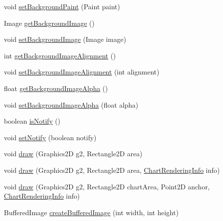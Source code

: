 \begin{DoxyCompactItemize}
\item 
void \mbox{\hyperlink{classorg_1_1jfree_1_1chart_1_1_j_free_chart_a425911935a24fdd3fde08dca49512c2a}{set\+Background\+Paint}} (Paint paint)
\item 
Image \mbox{\hyperlink{classorg_1_1jfree_1_1chart_1_1_j_free_chart_a54597d54f86fd436c244870472e317be}{get\+Background\+Image}} ()
\item 
void \mbox{\hyperlink{classorg_1_1jfree_1_1chart_1_1_j_free_chart_ab1a7deef8058f7f09b0e80c380bc2f68}{set\+Background\+Image}} (Image image)
\item 
int \mbox{\hyperlink{classorg_1_1jfree_1_1chart_1_1_j_free_chart_a2a1cf4fd0bd2aa6c7fb2ec37fabfb6f1}{get\+Background\+Image\+Alignment}} ()
\item 
void \mbox{\hyperlink{classorg_1_1jfree_1_1chart_1_1_j_free_chart_a7be0530e282f757e47b6aa9a8ac63b05}{set\+Background\+Image\+Alignment}} (int alignment)
\item 
float \mbox{\hyperlink{classorg_1_1jfree_1_1chart_1_1_j_free_chart_afe2ea70105325860b5ef380c25e42866}{get\+Background\+Image\+Alpha}} ()
\item 
void \mbox{\hyperlink{classorg_1_1jfree_1_1chart_1_1_j_free_chart_afe8e3a04968eed8d032c08b259aa7f46}{set\+Background\+Image\+Alpha}} (float alpha)
\item 
boolean \mbox{\hyperlink{classorg_1_1jfree_1_1chart_1_1_j_free_chart_ab3f7b1bca87ea773fab5f224aa25c989}{is\+Notify}} ()
\item 
void \mbox{\hyperlink{classorg_1_1jfree_1_1chart_1_1_j_free_chart_a7756201ec1d421db8880a1c243d2f6f9}{set\+Notify}} (boolean notify)
\item 
void \mbox{\hyperlink{classorg_1_1jfree_1_1chart_1_1_j_free_chart_a319d136fc007faada9be1db3005a55cd}{draw}} (Graphics2D g2, Rectangle2D area)
\item 
void \mbox{\hyperlink{classorg_1_1jfree_1_1chart_1_1_j_free_chart_a2974c0ee0d98666c061a5183f6331717}{draw}} (Graphics2D g2, Rectangle2D area, \mbox{\hyperlink{classorg_1_1jfree_1_1chart_1_1_chart_rendering_info}{Chart\+Rendering\+Info}} info)
\item 
void \mbox{\hyperlink{classorg_1_1jfree_1_1chart_1_1_j_free_chart_a1e38c9015bb05574a40f28efd4934298}{draw}} (Graphics2D g2, Rectangle2D chart\+Area, Point2D anchor, \mbox{\hyperlink{classorg_1_1jfree_1_1chart_1_1_chart_rendering_info}{Chart\+Rendering\+Info}} info)
\item 
Buffered\+Image \mbox{\hyperlink{classorg_1_1jfree_1_1chart_1_1_j_free_chart_ac210618938e02e783f41126ed748127b}{create\+Buffered\+Image}} (int width, int height)

\end{DoxyCompactItemize}
